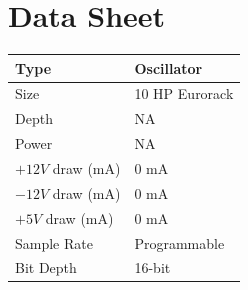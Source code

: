 \documentclass[12pt,letter]{article}
\begin{document}

\clearpage
\section{Data Sheet}

\begin{table}[!htp]
\begin{tabular}{|l|l|}
\hline
Type             & Oscillator               \\
\hline
Size             & 10 HP Eurorack           \\
\hline
Depth            & NA                       \\
\hline
Power            & NA                       \\ %
\hline
$+12V$ draw (mA) & 0 mA                     \\
\hline
$-12V$ draw (mA) & 0 mA                     \\
\hline
$+5V$ draw (mA)  & 0 mA                     \\
\hline
Sample Rate      & Programmable             \\
\hline
Bit Depth        & 16-bit                   \\
\hline
\end{tabular}
\end{table}


\clearpage
\renewcommand\refname{References}
\nocite{*}


\end{document}
